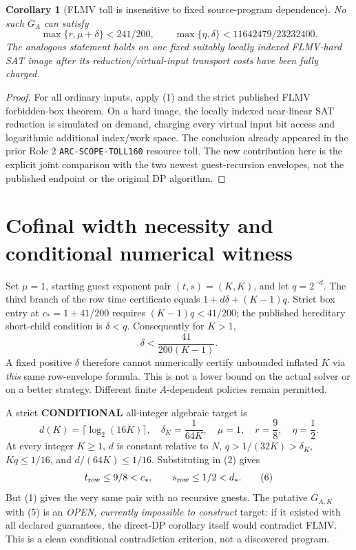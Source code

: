 \documentclass[11pt]{article}
\newtheorem{corollary}[theorem]{Corollary}
\begin{document}
\begin{corollary}[FLMV toll is insensitive to fixed source-program dependence]
No such $G_A$ can satisfy
\[
\boxed{\quad
\max\{r,\mu+\delta\}<241/200,\qquad
\max\{\eta,\delta\}<11642479/23232400.\quad}\tag{3}
\]
The analogous statement holds on one fixed suitably locally indexed
FLMV-hard SAT image after its reduction/virtual-input transport costs
have been fully charged.
\end{corollary}
\begin{proof}
For all ordinary inputs, apply (1) and the strict published FLMV
forbidden-box theorem. On a hard image, the locally indexed
near-linear SAT reduction is simulated on demand, charging every
virtual input bit access and logarithmic additional index/work space.
The conclusion already appeared in the prior Role 2
\texttt{ARC-SCOPE-TOLL160} resource toll. The new contribution here
is the explicit joint comparison with the two newest guest-recursion
envelopes, not the published endpoint or the original DP algorithm.
\end{proof}

\section{Cofinal width necessity and conditional numerical witness}
Set $\mu=1$, starting guest exponent pair $(t,s)=(K,K)$, and let
$q=2^{-d}$. The third branch of the row time certificate equals
$1+d\delta+(K-1)q$. Strict box entry at $c_*=1+41/200$ requires
$(K-1)q<41/200$; the published hereditary short-child condition
is $\delta<q$. Consequently for $K>1$,
\[
\boxed{\quad \delta<\frac{41}{200(K-1)}.\quad}\tag{4}
\]
A fixed positive $\delta$ therefore cannot numerically certify
unbounded inflated $K$ via \emph{this} same row-envelope formula.
This is not a lower bound on the actual solver or on a better
strategy. Different finite $A$-dependent policies remain permitted.

A strict \textbf{CONDITIONAL} all-integer algebraic target is
\[
d(K)=\lceil\log_2(16K)\rceil,\quad
\delta_K=\frac{1}{64K},\quad
\mu=1,\quad r=\frac98,\quad\eta=\frac12.\tag{5}
\]
At every integer $K\ge1$, $d$ is constant relative to $N$,
$q>1/(32K)>\delta_K$, $Kq\le1/16$, and
$d/(64K)\le1/16$. Substituting in (2) gives
\[
t_{\rm row}\le9/8<c_*,\qquad s_{\rm row}\le1/2<d_*.
\tag{6}
\]
But (1) gives the very same pair with no recursive guests.
The putative $G_{A,K}$ with (5) is an \emph{OPEN, currently impossible
to construct} target: if it existed with all declared guarantees,
the direct-DP corollary itself would contradict FLMV. This is a
clean conditional contradiction criterion, not a discovered program.
\end{document}

